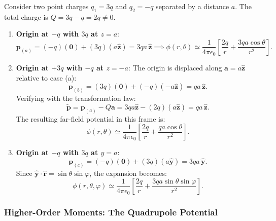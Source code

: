 \begin{example}
Consider two point charges \(q_1 = 3q\) and \(q_2 = -q\) separated by a distance \(a\). The total charge is \(Q = 3q - q = 2q \neq 0\).
\begin{enumerate}
    \item \textbf{Origin at \(-q\) with $3q$ at \(z = a\)}:
    \begin{equation}
        \bm{p}_{(a)} = (-q)(\bm{0}) + (3q)(a\hat{\bm{z}}) = 3qa\,\hat{\bm{z}} \implies \phi(r, \theta) \simeq \frac{1}{4\pi\epsilon_0}\left[\frac{2q}{r} + \frac{3qa\cos\theta}{r^2}\right].
    \end{equation}
    \item \textbf{Origin at \(+3q\) with \(-q\) at \(z = -a\)}:
    The origin is displaced along \(\bm{a} = a\hat{\bm{z}}\) relative to case (a):
    \begin{equation}
        \bm{p}_{(b)} = (3q)(\bm{0}) + (-q)(-a\hat{\bm{z}}) = qa\,\hat{\bm{z}}.
    \end{equation}
    Verifying with the transformation law:
    \begin{equation}
        \widetilde{\bm{p}} = \bm{p}_{(a)} - Q\bm{a} = 3qa\hat{\bm{z}} - (2q)(a\hat{\bm{z}}) = qa\,\hat{\bm{z}}.
    \end{equation}
    The resulting far-field potential in this frame is:
    \begin{equation}
        \phi(r, \theta) \simeq \frac{1}{4\pi\epsilon_0}\left[\frac{2q}{r} + \frac{qa\cos\theta}{r^2}\right].
    \end{equation}
    \item \textbf{Origin at \(-q\) with $3q$ at \(y = a\)}:
    \begin{equation}
        \bm{p}_{(c)} = (-q)(\bm{0}) + (3q)(a\hat{\bm{y}}) = 3qa\,\hat{\bm{y}}.
    \end{equation}
    Since \(\hat{\bm{y}}\cdot\hat{\bm{r}} = \sin\theta\sin\varphi\), the expansion becomes:
    \begin{equation}
        \phi(r, \theta, \varphi) \simeq \frac{1}{4\pi\epsilon_0}\left[\frac{2q}{r} + \frac{3qa\sin\theta\sin\varphi}{r^2}\right].
    \end{equation}
\end{enumerate}
\end{example}

\subsubsection{Higher-Order Moments: The Quadrupole Potential}

